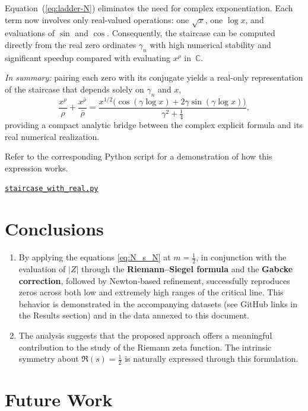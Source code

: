 \documentclass[11pt,a4paper]{article}
\begin{document}
Equation~(\ref{eq:ladder-N}) eliminates the need for complex
exponentiation.  Each term now involves only
real-valued operations:
one $\sqrt{x}$, one $\log x$, and evaluations of
$\sin$ and $\cos$.
Consequently, the staircase can be computed directly from
the real zero ordinates $\gamma_n$ with high numerical stability and
significant speedup compared with evaluating $x^{\rho}$ in~$\mathbb{C}$.

\medskip
\noindent
\emph{In summary:} pairing each zero with its conjugate yields a
real-only representation of the staircase that depends solely on
$\gamma_n$ and $x$,
\[
\frac{x^{\rho}}{\rho}+\frac{x^{\bar\rho}}{\bar\rho}
=
\frac{x^{1/2}\bigl(\cos(\gamma\log x)+2\gamma\sin(\gamma\log x)\bigr)}{\gamma^2+\tfrac14},
\]
providing a compact analytic bridge between the complex
explicit formula and its real numerical realization.

\noindent
Refer to the corresponding Python script for a demonstration of how this expression works.

\noindent
\href{https://github.com/zjore/z-research/blob/main/staircase_with_real.py}{\texttt{staircase\_with\_real.py}}

\section{Conclusions}

\begin{enumerate}
    \item By applying the equations \eqref{eq:N_s_N} at \( m = \tfrac{1}{2} \), in conjunction with the evaluation of \(|Z|\) through the \textbf{Riemann--Siegel formula} and the \textbf{Gabcke correction}, followed by Newton-based refinement, successfully reproduces zeros across both low and extremely high ranges of the critical line.  
    This behavior is demonstrated in the accompanying datasets (see GitHub links in the Results section) and in the data annexed to this document.
    
    \item The analysis suggests that the proposed approach offers a meaningful contribution to the study of the Riemann zeta function.  
    The intrinsic symmetry about \( \Re(s) = \tfrac{1}{2} \) is naturally expressed through this formulation.
\end{enumerate}

\section{Future Work}
\end{document}
